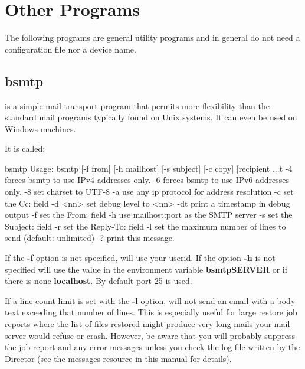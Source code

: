\section{Other Programs}

The following programs are general utility programs and in general do not need
a configuration file nor a device name.


\subsection{bsmtp}
\label{bsmtp}

 is a simple mail transport program that permits more flexibility
than the standard mail programs typically found on Unix systems. It can even
be used on Windows machines.

It is called:
\begin{commands}{bsmtp}
Usage: bsmtp [-f from] [-h mailhost] [-s subject] [-c copy] [recipient ...t
       -4          forces bsmtp to use IPv4 addresses only.
       -6          forces bsmtp to use IPv6 addresses only.
       -8          set charset to UTF-8
       -a          use any ip protocol for address resolution
       -c          set the Cc: field
       -d <nn>     set debug level to <nn>
       -dt         print a timestamp in debug output
       -f          set the From: field
       -h          use mailhost:port as the SMTP server
       -s          set the Subject: field
       -r          set the Reply-To: field
       -l          set the maximum number of lines to send (default: unlimited)
       -?          print this message.
\end{commands}

If the {\bf -f} option is not specified,  will use your userid. If
the option {\bf -h} is not specified  will use the value in the environment
variable {\bf bsmtpSERVER} or if there is none {\bf localhost}. By default
port 25 is used.

If a line count limit is set with the {\bf -l} option,  will
not send an email with a body text exceeding that number of lines. This
is especially useful for large restore job reports where the list of
files restored might produce very long mails your mail-server would
refuse or crash. However, be aware that you will probably suppress the
job report and any error messages unless you check the log file written
by the Director (see the messages resource in this manual for details).


